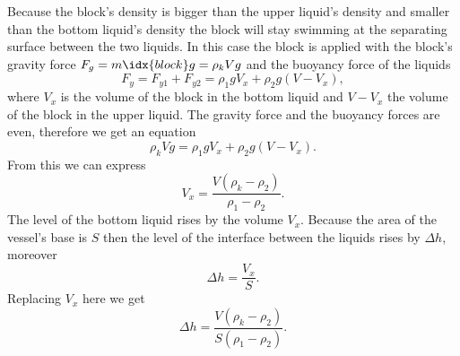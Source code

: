 {\ifEngSolution
Because the block’s density is bigger than the upper liquid’s density and smaller than the bottom liquid’s density the block will stay swimming at the separating surface between the two liquids. In this case the block is applied with the block’s gravity force $F_g = m\idx{block}g=\rho_k Vg$ and the buoyancy force of the liquids 
\[ F_y=F_{y1}+F_{y2}=\rho_1gV_x + \rho_2g(V-V_x), \]
where $V_x$ is the volume of the block in the bottom liquid and $V-V_x$ the volume of the block in the upper liquid. The gravity force and the buoyancy forces are even, therefore we get an equation 
\[ \rho_k Vg = \rho_1gV_x + \rho_2g(V-V_x). \]
From this we can express
\[ V_x = \frac{V(\rho_k-\rho_2)}{\rho_1-\rho_2}. \]
The level of the bottom liquid rises by the volume $V_x$. Because the area of the vessel’s base is $S$ then the level of the interface between the liquids rises by $\Delta h$, moreover
\[ \Delta h = \frac{V_x}{S}. \]
Replacing $V_x$ here we get
\[ \Delta h = \frac{V(\rho_k-\rho_2)}{S(\rho_1-\rho_2)}. \]
\fi
}